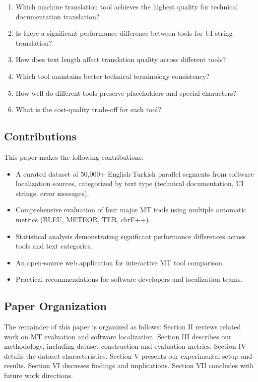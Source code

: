 \begin{enumerate}
    \item[\textbf{RQ1:}] Which machine translation tool achieves the highest quality for technical documentation translation?
    \item[\textbf{RQ2:}] Is there a significant performance difference between tools for UI string translation?
    \item[\textbf{RQ3:}] How does text length affect translation quality across different tools?
    \item[\textbf{RQ4:}] Which tool maintains better technical terminology consistency?
    \item[\textbf{RQ5:}] How well do different tools preserve placeholders and special characters?
    \item[\textbf{RQ6:}] What is the cost-quality trade-off for each tool?
\end{enumerate}

\subsection{Contributions}

This paper makes the following contributions:

\begin{itemize}
    \item A curated dataset of 50,000+ English-Turkish parallel segments from software localization sources, categorized by text type (technical documentation, UI strings, error messages).
    \item Comprehensive evaluation of four major MT tools using multiple automatic metrics (BLEU, METEOR, TER, chrF++).
    \item Statistical analysis demonstrating significant performance differences across tools and text categories.
    \item An open-source web application for interactive MT tool comparison.
    \item Practical recommendations for software developers and localization teams.
\end{itemize}

\subsection{Paper Organization}

The remainder of this paper is organized as follows: Section II reviews related work on MT evaluation and software localization. Section III describes our methodology, including dataset construction and evaluation metrics. Section IV details the dataset characteristics. Section V presents our experimental setup and results. Section VI discusses findings and implications. Section VII concludes with future work directions.

